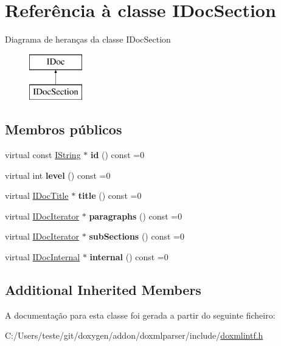 \hypertarget{class_i_doc_section}{\section{Referência à classe I\-Doc\-Section}
\label{class_i_doc_section}
}
Diagrama de heranças da classe I\-Doc\-Section\begin{figure}[H]
\begin{center}
\leavevmode
\includegraphics[height=2.000000cm]{class_i_doc_section}
\end{center}
\end{figure}
\subsection*{Membros públicos}
\begin{DoxyCompactItemize}
\item 
\hypertarget{class_i_doc_section_aaba28daa272dce8bc14dde330d5b0126}{virtual const \hyperlink{class_i_string}{I\-String} $\ast$ {\bfseries id} () const =0}\label{class_i_doc_section_aaba28daa272dce8bc14dde330d5b0126}

\item 
\hypertarget{class_i_doc_section_a802f73dd5a174329560646ae062b3ef7}{virtual int {\bfseries level} () const =0}\label{class_i_doc_section_a802f73dd5a174329560646ae062b3ef7}

\item 
\hypertarget{class_i_doc_section_a1ee1dd58be84d0895b21f8f37d7dbd4f}{virtual \hyperlink{class_i_doc_title}{I\-Doc\-Title} $\ast$ {\bfseries title} () const =0}\label{class_i_doc_section_a1ee1dd58be84d0895b21f8f37d7dbd4f}

\item 
\hypertarget{class_i_doc_section_ae1fe3e12effaa793bab3244c2cf6482e}{virtual \hyperlink{class_i_doc_iterator}{I\-Doc\-Iterator} $\ast$ {\bfseries paragraphs} () const =0}\label{class_i_doc_section_ae1fe3e12effaa793bab3244c2cf6482e}

\item 
\hypertarget{class_i_doc_section_a378ec891d6d588e15b2a3675ac9095b0}{virtual \hyperlink{class_i_doc_iterator}{I\-Doc\-Iterator} $\ast$ {\bfseries sub\-Sections} () const =0}\label{class_i_doc_section_a378ec891d6d588e15b2a3675ac9095b0}

\item 
\hypertarget{class_i_doc_section_a7ab2b3fa1ceaafef96db28149f7312bd}{virtual \hyperlink{class_i_doc_internal}{I\-Doc\-Internal} $\ast$ {\bfseries internal} () const =0}\label{class_i_doc_section_a7ab2b3fa1ceaafef96db28149f7312bd}

\end{DoxyCompactItemize}
\subsection*{Additional Inherited Members}


A documentação para esta classe foi gerada a partir do seguinte ficheiro\-:\begin{DoxyCompactItemize}
\item 
C\-:/\-Users/teste/git/doxygen/addon/doxmlparser/include/\hyperlink{include_2doxmlintf_8h}{doxmlintf.\-h}\end{DoxyCompactItemize}
